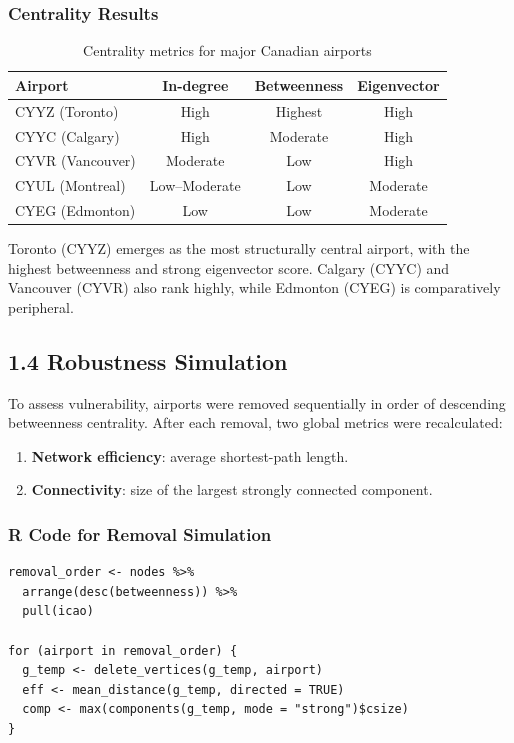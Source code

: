 \documentclass[9pt]{article}
\begin{document}
\subsubsection{Centrality Results}

\begin{table}[h!]
    \centering
    \caption{Centrality metrics for major Canadian airports}
    \begin{tabular}{lccc}
        \toprule
        Airport & In-degree & Betweenness & Eigenvector \\
        \midrule
        CYYZ (Toronto)   & High & Highest & High \\
        CYYC (Calgary)   & High & Moderate & High \\
        CYVR (Vancouver) & Moderate & Low & High \\
        CYUL (Montreal)  & Low–Moderate & Low & Moderate \\
        CYEG (Edmonton)  & Low & Low & Moderate \\
        \bottomrule
    \end{tabular}
\end{table}

Toronto (CYYZ) emerges as the most structurally central airport, with the highest betweenness and strong eigenvector score. Calgary (CYYC) and Vancouver (CYVR) also rank highly, while Edmonton (CYEG) is comparatively peripheral.

\subsection{1.4 Robustness Simulation}

To assess vulnerability, airports were removed sequentially in order of descending betweenness centrality. After each removal, two global metrics were recalculated:

\begin{enumerate}[label=\arabic*.]
    \item \textbf{Network efficiency}: average shortest-path length.
    \item \textbf{Connectivity}: size of the largest strongly connected component.
\end{enumerate}

\subsubsection{R Code for Removal Simulation}

\begin{verbatim}
removal_order <- nodes %>%
  arrange(desc(betweenness)) %>%
  pull(icao)

for (airport in removal_order) {
  g_temp <- delete_vertices(g_temp, airport)
  eff <- mean_distance(g_temp, directed = TRUE)
  comp <- max(components(g_temp, mode = "strong")$csize)
}
\end{verbatim}
\end{document}
